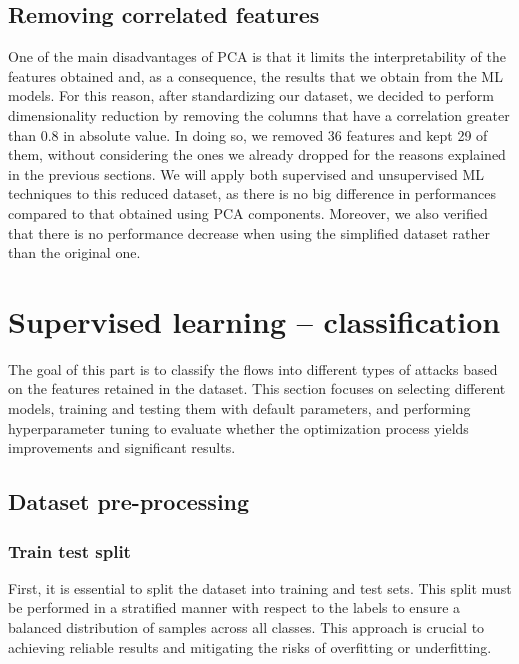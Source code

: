 \documentclass[acmlarge,nonacm]{acmart}
\begin{document}
\subsection{Removing correlated features}\label{sec:removeCorretedFeatures}
One of the main disadvantages of PCA is that it limits the interpretability of the features obtained and, as a consequence, the results that we obtain from the ML models. For this reason, after standardizing our dataset, we decided to perform dimensionality reduction by removing the columns that have a correlation greater than \num{0.8} in absolute value. In doing so, we removed 36 features and kept 29 of them, without considering the ones we already dropped for the reasons explained in the previous sections. We will apply both supervised and unsupervised ML techniques to this reduced dataset, as there is no big difference in performances compared to that obtained using PCA components. Moreover, we also verified that there is no performance decrease when using the simplified dataset rather than the original one.

\section{Supervised learning – classification} \label{sec:supervisedLearning}
The goal of this part is to classify the flows into different types of attacks based on the features retained in the dataset. This section focuses on selecting different models, training and testing them with default parameters, and performing hyperparameter tuning to evaluate whether the optimization process yields improvements and significant results.  

\subsection{Dataset pre-processing}
\subsubsection{Train test split}
First, it is essential to split the dataset into training and test sets. This split must be performed in a stratified manner with respect to the labels to ensure a balanced distribution of samples across all classes. This approach is crucial to achieving reliable results and mitigating the risks of overfitting or underfitting. 
\end{document}
